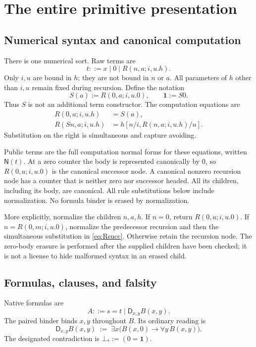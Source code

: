 \documentclass[11pt,letterpaper]{article}
\theoremstyle{definition}\newtheorem{definition}[theorem]{Definition}
\theoremstyle{remark}\newtheorem{remark}[theorem]{Remark}
\newcommand{\NF}{\mathsf N}
\newcommand{\DD}{\mathsf D}
\newcommand{\one}{\mathbf1}
\begin{document}
\section{The entire primitive presentation}\label{sec:calculus}

\subsection{Numerical syntax and canonical computation}
There is one numerical sort. Raw terms are
\[
 t ::= x\mid 0\mid R(n,a;i,u.h).
\]
Only $i,u$ are bound in $h$; they are not bound in $n$ or $a$. All
parameters of $h$ other than $i,u$ remain fixed during recursion.
Define the notation
\[
 S(a):=R(0,a;i,u.0),\qquad \one:=S0.
\]
Thus $S$ is not an additional term constructor. The computation equations
are
\begin{align}
 R(0,a;i,u.h)&=S(a),\label{eq:Rzero}\\
 R(Sn,a;i,u.h)&=h[n/i,R(n,a;i,u.h)/u].\label{eq:Rsucc}
\end{align}
Substitution on the right is simultaneous and capture avoiding.

Public terms are the full computation normal forms for these equations,
written $\NF(t)$. At a zero counter the body is represented canonically
by $0$, so $R(0,a;i,u.0)$ is the canonical successor node. A canonical
nonzero recursion node has a counter that is neither zero nor
successor headed. All its children, including its body, are canonical.
All rule substitutions below include normalization. No formula binder
is erased by normalization.

More explicitly, normalize the children $n,a,h$. If $n=0$, return
$R(0,a;i,u.0)$. If $n=R(0,m;i,u.0)$, normalize the predecessor
recursion and then the simultaneous substitution in
\eqref{eq:Rsucc}. Otherwise retain the recursion node. The zero-body
erasure is performed after the supplied children have been checked;
it is not a license to hide malformed syntax in an erased child.

\subsection{Formulas, clauses, and falsity}
Native formulas are
\[
 A ::= s=t\mid \DD_{x,y}B(x,y).
\]
The paired binder binds $x,y$ throughout $B$. Its ordinary reading is
\begin{equation}\label{eq:Dreading}
 \DD_{x,y}B(x,y)\;:=\;
 \exists x\bigl(B(x,0)\to\forall y\,B(x,y)\bigr).
\end{equation}
The designated contradiction is $\bot_*:=(0=\one)$.
\end{document}
